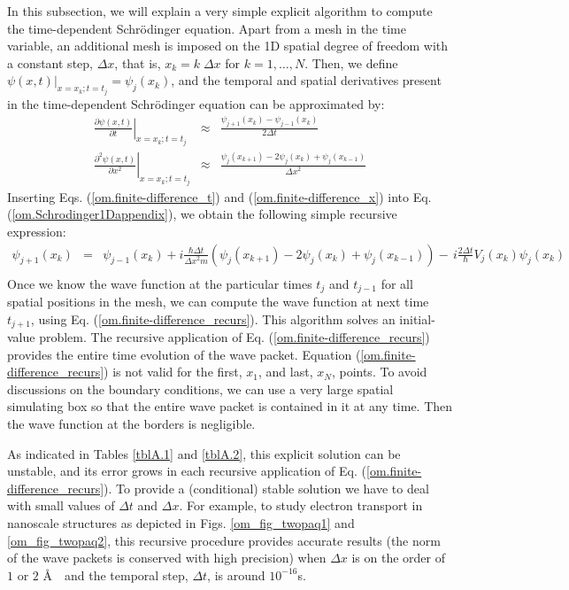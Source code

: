 \documentclass[nofootinbib, secnumarabic, amsmath, nobibnotes,10pt,aps,pra]{revtex4-1}
\newcommand{\eref}[1]{Eq. (\ref{#1})}
\newcommand{\Eref}[1]{Equation (\ref{#1})}
\begin{document}
In this subsection, we will explain a very simple explicit algorithm to compute the time-dependent Schr\"odinger equation. Apart from a mesh in the time variable, an additional mesh is imposed on the 1D spatial degree of freedom with a constant step, $\Delta x$, that is, $x_k = k \; \Delta x $ for $k = 1,\ldots,N$. Then, we define $\psi(x,t)|_{x = x_k;t = t_j} = \psi_{j}(x_k)$, and the temporal and spatial derivatives present in the time-dependent Schr\"odinger equation can be approximated by:
\begin{eqnarray}
\left.\frac{\partial \psi \left(x,t \right)}{\partial t}\right|_{x = x_k;t = t_j} &\approx& \frac{\psi_{j + 1}(x_k) - \psi_{j - 1}(x_k)} {2\Delta t} \label{om.finite-difference_t} \\
\left.\frac{{{\partial }^{2}}\psi \left( x,t \right)}{\partial {{x}^{2}}}\right|_{x = x_k;t = t_j} &\approx& \frac{\psi_{j}(x_{k + 1}) - 2\psi_{j}(x_{k}) + \psi_{j}(x_{k - 1})}{{\Delta x}^{2}} \label{om.finite-difference_x}
\end{eqnarray}
Inserting Eqs. (\ref{om.finite-difference_t}) and (\ref{om.finite-difference_x}) into \eref{om.Schrodinger1Dappendix}, we obtain the following simple recursive expression:
\begin{eqnarray}
\psi_{j + 1}(x_{k}) &=& \psi_{j - 1}(x_{k}) + i\frac{\hbar \Delta t}{{{\Delta x}^{2}}m}\left(\psi_{j}(x_{k + 1}) - 2\psi_{j}(x_{k}) + \psi_{j}(x_{k - 1})\right)-\,i\frac{2\Delta t}{\hbar }V_{j}(x_k) \psi_{j}(x_{k})\nonumber\\
\label{om.finite-difference_recurs}
\end{eqnarray}
Once we know the wave function at the particular times $t_j$ and
$t_{j - 1}$ for all spatial positions in the mesh, we can compute
the wave function at next time $t_{j + 1}$, using
\eref{om.finite-difference_recurs}. This algorithm solves an
initial-value problem. The recursive application of
\eref{om.finite-difference_recurs} provides the entire time
evolution of the wave packet. \Eref{om.finite-difference_recurs} is
not valid for the first, $x_1$, and last, $x_N$, points. To avoid
discussions on the boundary conditions, we can use a very large
spatial simulating box so that the entire wave packet is contained
in it at any time. Then the wave function at the borders is
negligible.\enlargethispage{-1pc}

As indicated in Tables \ref{tblA.1} and \ref{tblA.2}, this explicit
solution can be unstable, and its error grows in each recursive
application of \eref{om.finite-difference_recurs}. To provide a
(conditional) stable solution we have to deal with small
values of $\Delta t$ and $\Delta x$. For example, to study electron
transport in nanoscale structures as depicted in
Figs. \ref{om_fig_twopaq1} and \ref{om_fig_twopaq2}, this recursive
procedure provides accurate results (the norm of the wave packets is
conserved with high precision) when $\Delta x$ is on the order of
$1$ or $2$ \AA \  \ and the temporal step, $\Delta t$, is around
$10^{-16}$s.
\end{document}
